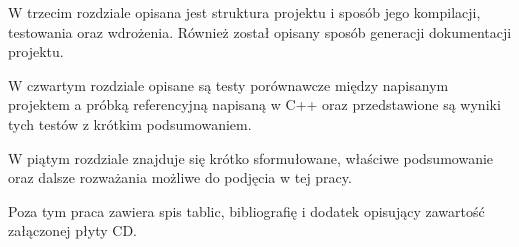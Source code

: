 \documentclass[../../praca.tex]{subfiles}
\begin{document}
W trzecim rozdziale opisana jest struktura projektu i sposób jego kompilacji, testowania
oraz wdrożenia. Również został opisany sposób generacji dokumentacji projektu.

W czwartym rozdziale opisane są testy porównawcze między napisanym projektem a próbką 
referencyjną napisaną w C++ oraz przedstawione są wyniki tych testów z krótkim 
podsumowaniem.

W piątym rozdziale znajduje się krótko sformułowane, właściwe podsumowanie oraz dalsze
rozważania możliwe do podjęcia w tej pracy.

Poza tym praca zawiera spis tablic, bibliografię i dodatek opisujący zawartość załączonej
płyty CD.
\end{document}

